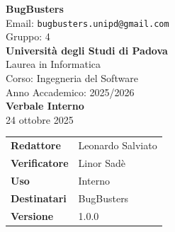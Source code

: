 \documentclass[a4paper,12pt]{article}
\begin{document}
\begin{center}  
  
  {\Large\bfseries\color{primaryblue} BugBusters}\\[0.3cm]
  {\small\color{darkgray} Email: \texttt{bugbusters.unipd@gmail.com}} \\[0.1cm]
  {\small\color{darkgray} Gruppo: 4} \\[0.5cm]

  {\large\bfseries Università degli Studi di Padova}\\[0.3cm]
  {\small Laurea in Informatica}\\[0.2cm]
  {\small Corso: Ingegneria del Software}\\[0.2cm]
  {\small Anno Accademico: 2025/2026}\\[0.8cm]

  {\Huge\bfseries\color{primaryblue} Verbale Interno}\\[0.3cm]
  {\Large\color{secondaryblue} 24 ottobre 2025}\\[0.8cm]
\end{center}

\begin{center}
\begin{tcolorbox}[colback=lightgray,colframe=primaryblue,width=0.85\textwidth,arc=3mm,boxrule=0.5pt]
\begin{tabular}{@{}ll@{}}
\textbf{Redattore}    & Leonardo Salviato\\
\textbf{Verificatore}    & Linor Sadè \\
\textbf{Uso}          & Interno \\
\textbf{Destinatari}  & BugBusters \\
\textbf{Versione} & 1.0.0\\

\end{tabular}
\end{tcolorbox}
\end{center}
\end{document}
